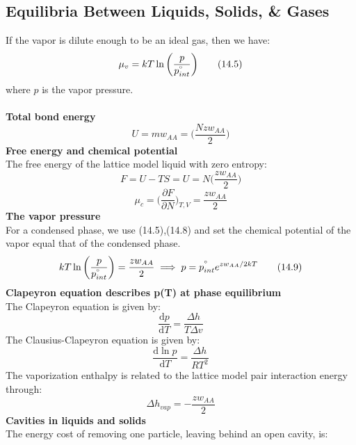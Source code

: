 \documentclass[8pt]{article}
\numberwithin{equation}{section}
\begin{document}
\begin{multicols}{2}
\section{Equilibria Between Liquids, Solids, \& Gases}
If the vapor is dilute enough to be an ideal gas, then we have: 
\begin{equation}
\mu_{v}=kT\ln{\bigg(\frac{p}{p_{int}^{\degree}} \bigg)} \tag{14.5}
\end{equation}
where $p$ is the vapor pressure. \\\\
\textbf{Total bond energy}
\begin{equation}
U=mw_{AA}=\bigg(\frac{Nzw_{AA}}{2}\bigg) \tag{14.6}
\end{equation}
\textbf{Free energy and chemical potential} \\
The free energy of the lattice model liquid with zero entropy:
\begin{equation}
F=U-TS=U=N\bigg(\frac{zw_{AA}}{2}\bigg) \tag{14.7}
\end{equation}
\begin{equation}
\mu_{c}=\bigg(\frac{\partial F}{\partial N}\bigg)_{T,V}=\frac{zw_{AA}}{2} \tag{14.8}
\end{equation}
\textbf{The vapor pressure}\\
For a condensed phase, we use (14.5),(14.8) and set the chemical potential of the vapor equal that of the condensed phase. 
\begin{equation}
kT\ln{\bigg(\frac{p}{p_{int}^{\degree}} \bigg)}=\frac{zw_{AA}}{2} \implies p=p_{int}^{\degree}e^{zw_{AA}/2kT} \tag{14.9}
\end{equation}
\textbf{Clapeyron equation describes p(T) at phase equilibrium}\\
The Clapeyron equation is given by: 
\begin{equation}
\frac{\mathrm{d}p}{\mathrm{d}T}=\frac{\Delta h}{T\Delta v} \tag{14.19}
\end{equation}
The Clausius-Clapeyron equation is given by: 
\begin{equation}
\frac{\mathrm{d}\ln{p}}{\mathrm{d}T}=\frac{\Delta h}{RT^{2}} \tag{14.20}
\end{equation}
The vaporization enthalpy is related to the lattice model pair interaction energy through:
\begin{equation}
\Delta h_{vap}=-\frac{zw_{AA}}{2} \tag{14.22}
\end{equation}
\textbf{Cavities in liquids and solids}\\
The energy cost of removing one particle, leaving behind an open cavity, is: 

\end{multicols}
\end{document}
